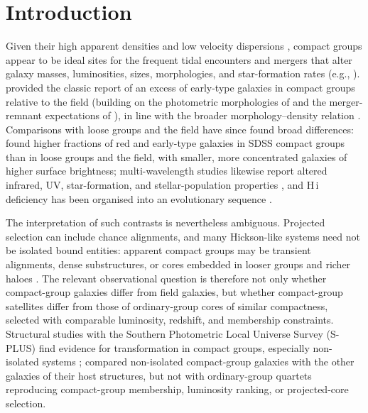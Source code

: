 \documentclass{aa}
\begin{document}

   \maketitle








\section{Introduction}\label{sec:intro}

Given their high apparent densities and low velocity dispersions \citep{Hickson82,Hickson+92}, compact groups appear to be ideal sites for the frequent tidal encounters and mergers that alter galaxy masses, luminosities, sizes, morphologies, and star-formation rates (e.g., \citealt{Mamon92}). \citet{MendesdeOliveira&Hickson94} provided the classic report of an excess of early-type galaxies in compact groups relative to the field (building on the photometric morphologies of \citealt{HKA89} and the merger-remnant expectations of \citealt{ZepfWhitmore93}), in line with the broader morphology--density relation \citep{Dressler80}. Comparisons with loose groups and the field have since found broad differences: \citet{Coenda+12} found higher fractions of red and early-type galaxies in SDSS compact groups than in loose groups and the field, with smaller, more concentrated galaxies of higher surface brightness; multi-wavelength studies likewise report altered infrared, UV, star-formation, and stellar-population properties \citep{Johnson+07,Tzanavaris+10,Bitsakis+11}, and H\,{\sc i} deficiency has been organised into an evolutionary sequence \citep{VerdesMontenegro+01}.

The interpretation of such contrasts is nevertheless ambiguous. Projected selection can include chance alignments, and many Hickson-like systems need not be isolated bound entities: apparent compact groups may be transient alignments, dense substructures, or cores embedded in looser groups and richer haloes \citep{Mamon86,DiazGimenez&Mamon10,DiazGimenez+20,Zheng&Shen21,Taverna+23}. The relevant observational question is therefore not only whether compact-group galaxies differ from field galaxies, but whether compact-group satellites differ from those of ordinary-group cores of similar compactness, selected with comparable luminosity, redshift, and membership constraints. Structural studies with the Southern Photometric Local Universe Survey (S-PLUS) find evidence for transformation in compact groups, especially non-isolated systems \citep{Montaguth2023,Montaguth2025,Montaguth2026MassSize,Montaguth2026NonIsolated}; \citet{Montaguth2026NonIsolated} compared non-isolated compact-group galaxies with the other galaxies of their host structures, but not with ordinary-group quartets reproducing compact-group membership, luminosity ranking, or projected-core selection.
\end{document}
